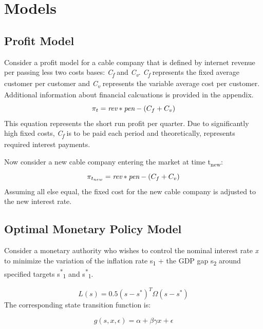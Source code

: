 \documentclass[a4paper,oneside]{article}
\begin{document}
\section{Models}
\subsection{Profit Model}
\:\:\:\:\:\: Consider a profit model for a cable company that is defined by internet revenue per passing less two costs bases: \emph{C\textsubscript{f}} and \emph{C\textsubscript{v}}. 
\emph{C\textsubscript{f}} represents the fixed average customer per customer and \emph{C\textsubscript{v}} represents the variable average cost per customer. 
Additional information about financial calcuations is provided in the appendix. 
\begin{equation}
	\pi_{t} = \emph{rev} * \emph{pen} - (C_{f}+C_{v})
\end{equation}
This equation represents the short run profit per quarter. 
Due to significantly high fixed costs, \emph{C\textsubscript{f}} is to be paid each period and theoretically, represents required interest payments.

Now consider a new cable company entering the market at time t\textsubscript{new}:
\begin{equation}
	\pi_{t_{new}} = \emph{rev} * \emph{pen} - (C_{f}+C_{v})
\end{equation}
Assuming all else equal, the fixed cost for the new cable company is adjusted to the new interest rate.

\subsection{Optimal Monetary Policy Model}

\:\:\:\:\:\:\:\:Consider a monetary authority who wishes to control the nominal interest rate  \emph{x} to minimize the variation of the inflation rate s\textsubscript{1} + the GDP gap s\textsubscript{2} around specified targets s\textsuperscript{*}\textsubscript{1} and s\textsuperscript{*}\textsubscript{1}.

\begin{equation}
	L(s) = 0.5(s-s^{*})^{T}\Omega(s-s^{*})
	\label{eq:mye1}
\end{equation} 
The corresponding state transition function is: 

\begin{equation}
	g(s,x,\epsilon) = \alpha + \beta \gamma x + \epsilon
	\label{eq:myeq2}
\end{equation} 
\end{document}
